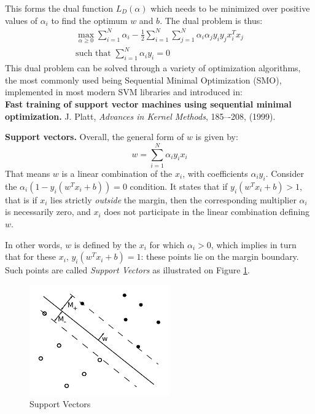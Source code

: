 \documentclass{article}
\begin{document}
This forms the dual function $L_D(\alpha)$ which needs to be minimized over positive values of $\alpha_i$ to find the optimum $w$ and $b$. The dual problem is thus:
\begin{gather*}
\max_{\alpha \geq 0} \sum_{i=1}^N \alpha_i - \frac{1}{2} \sum_{i=1}^N \sum_{j=1}^N  \alpha_i \alpha_j y_i y_j x_i^T x_j\\
\text{such that }\sum_{i=1}^N \alpha_i y_i = 0
\end{gather*}
This dual problem can be solved through a variety of optimization algorithms, the most commonly used being Sequential Minimal Optimization (SMO), implemented in most modern SVM libraries and introduced in:\\
\textbf{Fast training of support vector machines using sequential minimal optimization.} J. Platt, \textit{Advances in Kernel Methods}, 185–-208, (1999).

\textbf{Support vectors.} Overall, the general form of $w$ is given by:
\begin{equation*}
w= \sum_{i=1}^N \alpha_i y_i x_i
\end{equation*}
That means $w$ is a linear combination of the $x_i$, with coefficients $\alpha_i y_i$. Consider the $\alpha_i\left(1-y_i\left( w^Tx_i + b \right)\right) = 0$  condition. It states that if $y_i\left( w^Tx_i + b \right) > 1$, that is if $x_i$ lies strictly \emph{outside} the margin, then the corresponding multiplier $\alpha_i$ is necessarily zero, and $x_i$ does not participate in the linear combination defining $w$.

In other words, $w$ is defined by the $x_i$ for which $\alpha_i > 0$, which implies in turn that for these $x_i$, $y_i\left( w^Tx_i + b \right) = 1$: these points lie on the margin boundary. Such points are called \emph{Support Vectors} as illustrated on Figure \ref{fig:lin-lin2}.

\begin{figure}
\begin{center}
\includegraphics[width=6cm]{../img/lin_sep3.pdf}
\end{center}
\caption{Support Vectors}
\label{fig:lin-lin2}
\end{figure}
\end{document}

